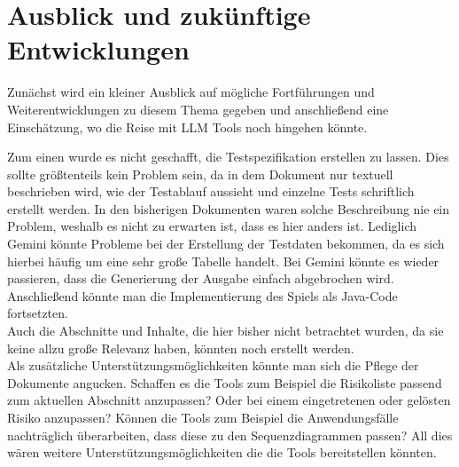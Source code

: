 \section{Ausblick und zukünftige Entwicklungen}  \label{Ausblick und zukünftige Entwicklungen}

Zunächst wird ein kleiner Ausblick auf mögliche Fortführungen und Weiterentwicklungen zu diesem Thema gegeben und anschließend 
eine Einschätzung, wo die Reise mit LLM Tools noch hingehen könnte.

Zum einen wurde es nicht geschafft, die Testspezifikation erstellen zu lassen. Dies sollte größtenteils kein Problem sein, da 
in dem Dokument nur textuell beschrieben wird, wie der Testablauf aussieht und einzelne Tests schriftlich erstellt werden. 
In den bisherigen Dokumenten waren solche Beschreibung nie ein Problem, weshalb es nicht zu erwarten ist, dass es hier anders ist.
Lediglich Gemini könnte Probleme bei der Erstellung der Testdaten bekommen, da es sich hierbei häufig um eine sehr große Tabelle handelt.
Bei Gemini könnte es wieder passieren, dass die Generierung der Ausgabe einfach abgebrochen wird.\\
Anschließend könnte man die Implementierung des Spiels als Java-Code fortsetzten.\\
Auch die Abschnitte und Inhalte, die hier bisher nicht betrachtet wurden, da sie keine allzu große Relevanz haben, könnten noch 
erstellt werden.\\
Als zusätzliche Unterstützungsmöglichkeiten könnte man sich die Pflege der Dokumente angucken. Schaffen es die Tools zum Beispiel 
die Risikoliste passend zum aktuellen Abschnitt anzupassen? Oder bei einem eingetretenen oder gelösten Risiko anzupassen? Können 
die Tools zum Beispiel die Anwendungsfälle nachträglich überarbeiten, dass diese zu den Sequenzdiagrammen passen? All dies wären weitere 
Unterstützungsmöglichkeiten die die Tools bereitstellen könnten.

